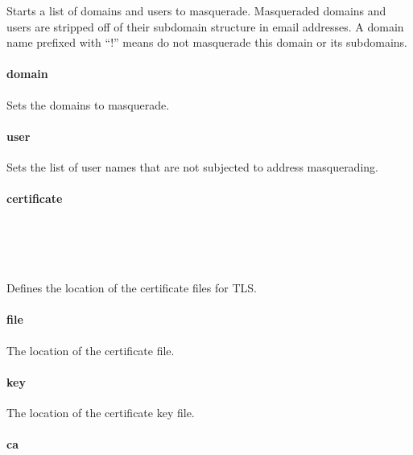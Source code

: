 
Starts a list of domains and users to masquerade. Masqueraded domains and
users are stripped off of their subdomain structure in email addresses.
A domain name prefixed with ``!'' means do not masquerade this domain
or its subdomains.

\paragraph{domain}


Sets the domains to masquerade.

\paragraph{user}


Sets the list of user names that are not subjected to address masquerading.

\paragraph{certificate}

\\
\\
\\

Defines the location of the certificate files for TLS.

\paragraph{file}


The location of the certificate file.

\paragraph{key}


The location of the certificate key file.

\paragraph{ca}

